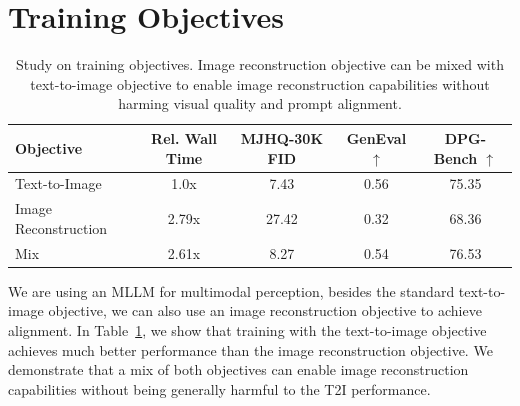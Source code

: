 \documentclass[]{fairmeta}
\begin{document}
\section{Training Objectives}
\label{app:training_objectives}

\begin{table}[!ht]
    \small
    \centering
    \begin{tabular}{lcccc}
        \textbf{Objective} & \textbf{Rel. Wall Time} & \textbf{MJHQ-30K FID } & \textbf{GenEval $\uparrow$} & \textbf{DPG-Bench $\uparrow$} \\
        \midrule
 Text-to-Image & 1.0x & \cellcolor{green!10}7.43 & \cellcolor{green!10}0.56 & 75.35 \\
 Image Reconstruction & 2.79x & 27.42 & 0.32 & 68.36 \\
 Mix & 2.61x & 8.27 & 0.54 & \cellcolor{green!10}76.53 \\
    \end{tabular}
    \caption{Study on training objectives. Image reconstruction objective can be mixed with text-to-image objective to enable image reconstruction capabilities without harming visual quality and prompt alignment.}
    \label{tab:objective}
\end{table}

We are using an MLLM for multimodal perception, besides the standard text-to-image objective, we can also use an image reconstruction objective to achieve alignment. In Table~\ref{tab:objective}, we show that training with the text-to-image objective achieves much better performance than the image reconstruction objective. We demonstrate that a mix of both objectives can enable image reconstruction capabilities without being generally harmful to the T2I performance.
\end{document}
